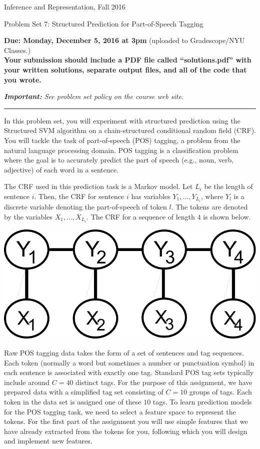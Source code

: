 \documentclass{article}
\newcommand{\ruleskip}{\bigskip\hrule\bigskip}
\begin{document}
\pagestyle{myheadings} 

{\LARGE
\begin{center}Inference and Representation, Fall 2016\end{center}
}

{\Large
Problem Set 7: Structured Prediction for Part-of-Speech Tagging
}

{\bf Due: Monday, December 5, 2016 at 3pm}  (uploaded to Gradescope/NYU Classes.)\\

{\bf Your submission should include a PDF file called ``solutions.pdf''
  with your written solutions, separate output files, and all of the
  code that you wrote.}

{\em {\bf Important:} See problem set policy on the course web site.}
\ruleskip

In this problem set, you will experiment with structured prediction using the Structured SVM algorithm on a chain-structured conditional random field (CRF). You will tackle the task of part-of-speech (POS) tagging, a problem from the natural language processing domain. POS tagging is a classification problem where the goal is to accurately predict the part of speech (e.g., noun, verb, adjective) of each word in a sentence. 

The CRF used in this prediction task is a Markov model. Let $L_i$ be the length of sentence $i$. Then, the CRF for sentence $i$ has variables $Y_1, \ldots, Y_{L_i}$, where $Y_l$ is a discrete variable denoting the part-of-speech of token $l$. The tokens are denoted by the variables $X_1, \ldots, X_{L_i}$. The CRF for a sequence of length $4$ is shown below.
\begin{center}
    \includegraphics[scale=0.35]{crf.pdf}
\end{center}

Raw POS tagging data takes the form of a set of sentences and tag sequences. Each token (normally a word but sometimes a number or punctuation symbol) in each sentence is associated with exactly one tag. Standard POS tag sets typically include around $C=40$ distinct tags. For the purpose of this assignment, we have prepared data with a simplified tag set consisting of $C=10$ groups of tags. Each token in the data set is assigned one of these $10$ tags. To learn prediction models for the POS tagging task, we need to select a feature space to represent the tokens. For the first part of the assignment you will use simple features that we have already extracted from the tokens for you, following which you will design and implement new features.
\end{document}
